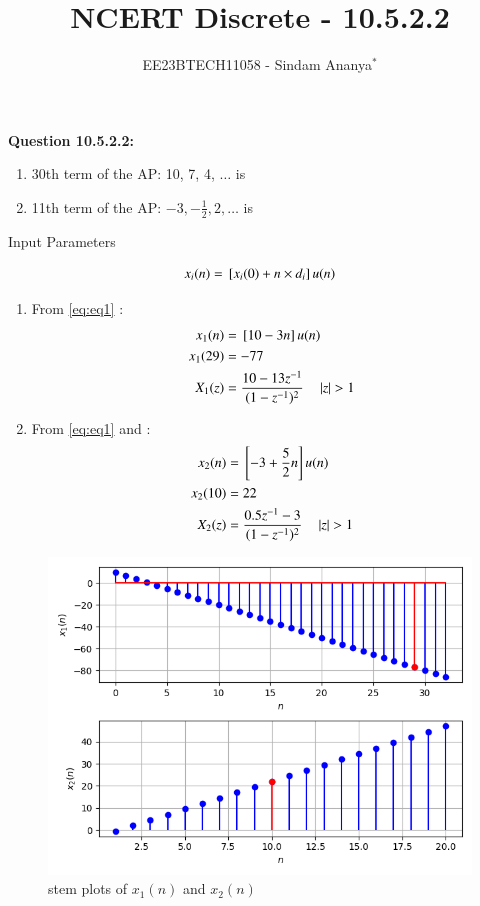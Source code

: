 \documentclass[journal,12pt,twocolumn]{IEEEtran}
\theoremstyle{remark}
\begin{document}

\vspace{3cm}

\title{NCERT Discrete - 10.5.2.2}
\author{EE23BTECH11058 - Sindam Ananya$^{*}$%
}
\maketitle
\newpage
\bigskip

\renewcommand{\thefigure}{\theenumi}
\renewcommand{\thetable}{\theenumi}

\vspace{3cm}
\textbf{Question 10.5.2.2:} 
\begin{enumerate}
\item 30th term of the AP: 10, 7, 4, $\ldots$ is 
\item 11th term of the AP: $-3, -\frac{1}{2}, 2, \ldots$ is
\end{enumerate}
\solution
\begin{table}[h!]
    \centering
    
    \caption{Input Parameters}
    \label{tab:table1}
    \end{table}
\begin{equation}
    x_i(n) = {}\left[x_i(0) + n \times d_i\right] u(n)
    \label{eq:eq1}
\end{equation}
\begin{enumerate}
\item From \eqref{eq:eq1}  :
\begin{align}
x_1(n) &= {}\left[10 -3n\right]u(n)\\
x_1(29) &= -77\\
X_1(z) &= \frac{10 - 13z^{-1}}{(1-z^{-1})^2} \quad \left\vert z\right\vert > 1
\end{align}
\item From \eqref{eq:eq1} and  :
\begin{align}
x_2(n) &= {}\left[-3 + \frac{5}{2}n\right]u(n)\\
x_2(10) &= 22\\
X_2(z) &= \frac{0.5z^{-1}-3}{(1-z^{-1})^2} \quad \left\vert z\right\vert> 1
\end{align}
\end{enumerate}
\begin{figure}[h!]
    \centering
    \includegraphics[width=\columnwidth]{figs/plot.png}
    \caption{stem plots of $x_1(n)$ and $x_2(n)$}
    \label{fig:1}
\end{figure}
\end{document}
